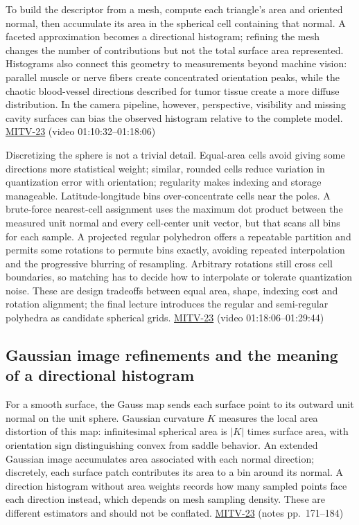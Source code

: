 To build the descriptor from a mesh, compute each triangle's area and oriented normal, then accumulate its area in the spherical cell containing that normal. A faceted approximation becomes a directional histogram; refining the mesh changes the number of contributions but not the total surface area represented. Histograms also connect this geometry to measurements beyond machine vision: parallel muscle or nerve fibers create concentrated orientation peaks, while the chaotic blood-vessel directions described for tumor tissue create a more diffuse distribution. In the camera pipeline, however, perspective, visibility and missing cavity surfaces can bias the observed histogram relative to the complete model. \hyperref[04-visual-computing-ii-ch036-mitv-23---gaussian-image-solids-of-revolution-direction-histograms-regular-polyhedra]{MITV-23} (video 01:10:32--01:18:06)

Discretizing the sphere is not a trivial detail. Equal-area cells avoid giving some directions more statistical weight; similar, rounded cells reduce variation in quantization error with orientation; regularity makes indexing and storage manageable. Latitude-longitude bins over-concentrate cells near the poles. A brute-force nearest-cell assignment uses the maximum dot product between the measured unit normal and every cell-center unit vector, but that scans all bins for each sample. A projected regular polyhedron offers a repeatable partition and permits some rotations to permute bins exactly, avoiding repeated interpolation and the progressive blurring of resampling. Arbitrary rotations still cross cell boundaries, so matching has to decide how to interpolate or tolerate quantization noise. These are design tradeoffs between equal area, shape, indexing cost and rotation alignment; the final lecture introduces the regular and semi-regular polyhedra as candidate spherical grids. \hyperref[04-visual-computing-ii-ch036-mitv-23---gaussian-image-solids-of-revolution-direction-histograms-regular-polyhedra]{MITV-23} (video 01:18:06--01:29:44)

\subsection{Gaussian image refinements and the meaning of a directional histogram}\label{04-visual-computing-ii-ch032-gaussian-image-refinements-and-the-meaning-of-a-directional-histogram}

For a smooth surface, the Gauss map sends each surface point to its outward unit normal on the unit sphere. Gaussian curvature \(K\) measures the local area distortion of this map: infinitesimal spherical area is \(|K|\) times surface area, with orientation sign distinguishing convex from saddle behavior. An extended Gaussian image accumulates area associated with each normal direction; discretely, each surface patch contributes its area to a bin around its normal. A direction histogram without area weights records how many sampled points face each direction instead, which depends on mesh sampling density. These are different estimators and should not be conflated. \hyperref[04-visual-computing-ii-ch036-mitv-23---gaussian-image-solids-of-revolution-direction-histograms-regular-polyhedra]{MITV-23} (notes pp.~171--184)

